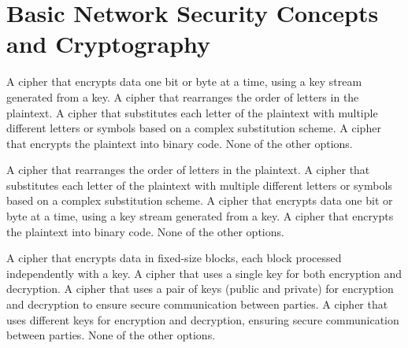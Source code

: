 \section{Basic Network Security Concepts and Cryptography}

\begin{checkboxes}
    \CorrectChoice A cipher that encrypts data one bit or byte at a time, using a key stream generated from a key.
    \choice A cipher that rearranges the order of letters in the plaintext.
    \choice A cipher that substitutes each letter of the plaintext with multiple different letters or symbols based on a complex substitution scheme.
    \choice A cipher that encrypts the plaintext into binary code.
    \choice None of the other options.
\end{checkboxes}

\begin{checkboxes}
    \choice A cipher that rearranges the order of letters in the plaintext.
    \choice A cipher that substitutes each letter of the plaintext with multiple different letters or symbols based on a complex substitution scheme.
    \choice A cipher that encrypts data one bit or byte at a time, using a key stream generated from a key.
    \choice A cipher that encrypts the plaintext into binary code.
    \CorrectChoice None of the other options.
\end{checkboxes}




\begin{checkboxes}
    \choice A cipher that encrypts data in fixed-size blocks, each block processed independently with a key.
    \choice A cipher that uses a single key for both encryption and decryption.
    \CorrectChoice A cipher that uses a pair of keys (public and private) for encryption and decryption to ensure secure communication between parties.
    \CorrectChoice A cipher that uses different keys for encryption and decryption, ensuring secure communication between parties.
    \choice None of the other options.
\end{checkboxes}


